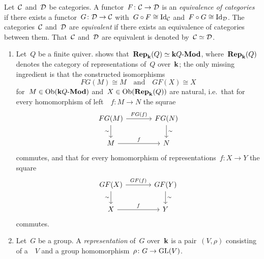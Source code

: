 \begin{definition}
  Let~$\mathcal{C}$ and~$\mathcal{D}$ be categories.
  A functor~$F \colon \mathcal{C} \to \mathcal{D}$ is an \emph{equivalence of categories} if there exists a functor~$G \colon \mathcal{D} \to \mathcal{C}$ with~$G \circ F \cong \mathrm{Id}_{\mathcal{C}}$ and~$F \circ G \cong \mathrm{Id}_{\mathcal{D}}$.
  The categories~$\mathcal{C}$ and~$\mathcal{D}$ are \emph{equivalent} if there exists an equivalence of categories between them.
  That~$\mathcal{C}$ and~$\mathcal{D}$ are equivalent is denoted by~$\mathcal{C} \simeq \mathcal{D}$.
\end{definition}


\begin{example}
  \leavevmode
  \begin{enumerate}
    \item
      Let~$Q$ be a finite quiver.
       shows that~$\mathbf{Rep}_{\mathbf{k}}(Q) \simeq \text{$\mathbf{k} Q$-$\mathbf{Mod}$}$, where~$\mathbf{Rep}_{\mathbf{k}}(Q)$ denotes the category of representations of~$Q$ over~$\kf$;
      the only missing ingredient is that the constructed isomorphisms
      \[
              FG(M)
        \cong M
        \quad\text{and}\quad
              GF(X)
        \cong X
      \]
      for~$M \in \operatorname{Ob}(\text{$\mathbf{k} Q$-$\mathbf{Mod}$})$ and~$X \in \operatorname{Ob}(\mathbf{Rep}_{\mathbf{k}}(Q))$ are natural, i.e.\ that for every homomorphism of left~{}~$f \colon M \to N$ the squrae
      \[
        \begin{tikzcd}[column sep = large]
            FG(M)
            \arrow{r}[above]{FG(f)}
            \arrow{d}[left]{\sim}
          & FG(N)
            \arrow{d}[right]{\sim}
          \\
            M
            \arrow{r}[above]{f}
          & N
        \end{tikzcd}
      \]
      commutes, and that for every homomorphism of representations~$f \colon X \to Y$ the square
      \[
        \begin{tikzcd}[column sep = large]
            GF(X)
            \arrow{r}[above]{GF(f)}
            \arrow{d}[left]{\sim}
          & GF(Y)
            \arrow{d}[right]{\sim}
          \\
            X
            \arrow{r}[above]{f}
          & Y
        \end{tikzcd}
      \]
      commutes.
    \item
      Let~$G$ be a group.
      A \emph{representation} of~$G$ over~$\kf$ is a pair~$(V,\rho)$ consisting of a~{\module{$\kf$}}~$V$ and a group homomorphism~$\rho \colon G \to \operatorname{GL}(V)$.

\end{enumerate}
\end{example}
